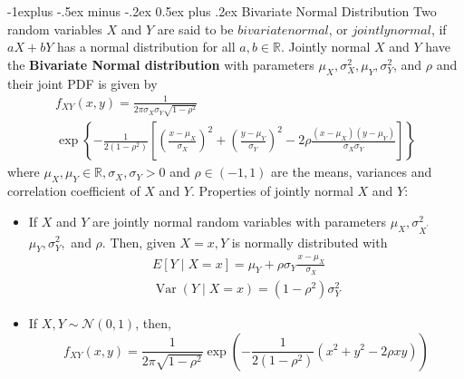 \documentclass[10pt,landscape]{article}
\makeatletter
\renewcommand{\subsection}{\@startsection{subsection}{2}{0mm}%
                                {-1explus -.5ex minus -.2ex}%
                                {0.5ex plus .2ex}%
                                {\normalfont\normalsize\bfseries}}
\makeatother
\begin{document}
\begin{multicols*}{3}
    \subsection{Bivariate Normal Distribution}
    Two random variables $X$ and $Y$ are said to be $bivariate normal$, or $jointly normal$, if $a X+b Y$ has a normal distribution for all $a, b \in \mathbb{R}$. Jointly normal $X$ and $Y$ have the \textbf{Bivariate Normal distribution} with parameters $\mu_{X}, \sigma_{X}^{2}, \mu_{Y}, \sigma_{Y}^{2}$, and $\rho$ and their joint PDF is given by
    $$
    \begin{array}{l}
        f_{X Y}(x, y)=\frac{1}{2 \pi \sigma_{X} \sigma_{Y} \sqrt{1-\rho^{2}}}                                                                                                                                                                             \\
        \exp \left\{-\frac{1}{2\left(1-\rho^{2}\right)}\left[\left(\frac{x-\mu_{X}}{\sigma_{X}}\right)^{2}+\left(\frac{y-\mu_{Y}}{\sigma_{Y}}\right)^{2}-2 \rho \frac{\left(x-\mu_{X}\right)\left(y-\mu_{Y}\right)}{\sigma_{X} \sigma_{Y}}\right]\right\} 
    \end{array}
    $$
    where $\mu_{X}, \mu_{Y} \in \mathbb{R}, \sigma_{X}, \sigma_{Y}>0$ and $\rho \in(-1,1)$ are the means, variances and correlation coefficient of $X$ and $Y$. Properties of jointly normal $X$ and $Y$:
    \begin{itemize}
        \item If $X$ and $Y$ are jointly normal random variables with parameters $\mu_{X}, \sigma_{X^{\prime}}^{2}$ $\mu_{Y}, \sigma_{Y}^{2},$ and $\rho .$ Then, given $X=x, Y$ is normally distributed with
              $$
              \begin{array}{l}
                E[Y \mid X=x]=\mu_{Y}+\rho \sigma_{Y} \frac{x-\mu_{X}}{\sigma_{X}}    \\
                \operatorname{Var}(Y \mid X=x)=\left(1-\rho^{2}\right) \sigma_{Y}^{2} 
              \end{array}
              $$
        \item If $X, Y \sim \mathcal{N}(0 ,1)$, then,
              $$  
              f_{XY}(x,y) = \frac{1}{2 \pi \sqrt{1-\rho^2}} \exp{\left(-\frac{1}{2 (1-\rho^2)} (x^2+y^2-2 \rho xy)\right)}
              $$
    \end{itemize}
                                    

\end{multicols*}
\end{document}
